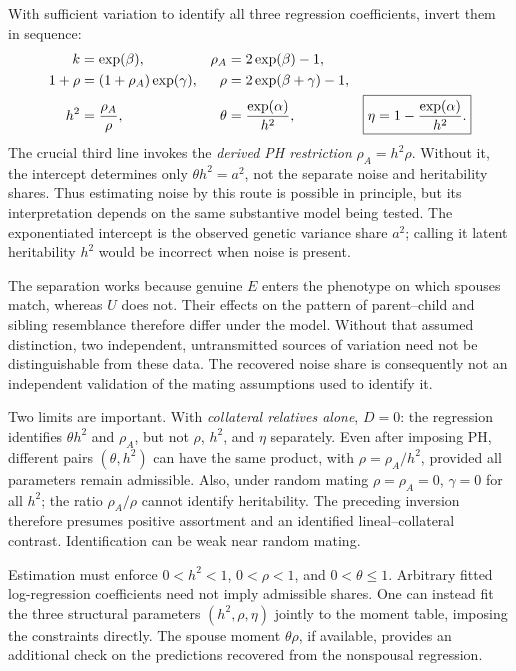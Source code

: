 With sufficient variation to identify all three regression coefficients,
invert them in sequence:
\begin{align}
 k&=\exp(\beta),&
 \rho_A&=2\exp(\beta)-1,\notag\\
 1+\rho&=(1+\rho_A)\exp(\gamma),&
 \rho&=2\exp(\beta+\gamma)-1,\notag\\
 h^2&=\frac{\rho_A}{\rho},&
 \theta&=\frac{\exp(\alpha)}{h^2},&
 \boxed{\eta=1-\frac{\exp(\alpha)}{h^2}.}
 \label{eq:me-inversion}
\end{align}
The crucial third line invokes the \emph{derived PH restriction}
$\rho_A=h^2\rho$. Without it, the intercept determines only
$\theta h^2=a^2$, not the separate noise and heritability shares.
Thus estimating noise by this route is possible in principle, but
its interpretation depends on the same substantive model being tested.
The exponentiated intercept is the observed genetic variance share $a^2$;
calling it latent heritability $h^2$ would be incorrect when noise is present.

The separation works because genuine $E$ enters the phenotype on which
spouses match, whereas $U$ does not. Their effects on the pattern of
parent--child and sibling resemblance therefore differ under the model.
Without that assumed distinction, two independent, untransmitted sources
of variation need not be distinguishable from these data. The recovered
noise share is consequently not an independent validation of the mating
assumptions used to identify it.

Two limits are important. With \emph{collateral relatives alone}, $D=0$:
the regression identifies $\theta h^2$ and $\rho_A$, but not $\rho$,
$h^2$, and $\eta$ separately. Even after imposing PH, different pairs
$(\theta,h^2)$ can have the same product, with
$\rho=\rho_A/h^2$, provided all parameters remain admissible.
Also, under random mating $\rho=\rho_A=0$, $\gamma=0$ for all $h^2$;
the ratio $\rho_A/\rho$ cannot identify heritability. The preceding
inversion therefore presumes positive assortment and an identified
lineal--collateral contrast. Identification can be weak near random
mating.

Estimation must enforce $0<h^2<1$, $0<\rho<1$, and
$0<\theta\leq1$. Arbitrary fitted log-regression coefficients need
not imply admissible shares. One can instead fit the three structural
parameters $(h^2,\rho,\eta)$ jointly to the moment table, imposing
the constraints directly. The spouse moment $\theta\rho$, if available,
provides an additional check on the predictions recovered from the
nonspousal regression.

